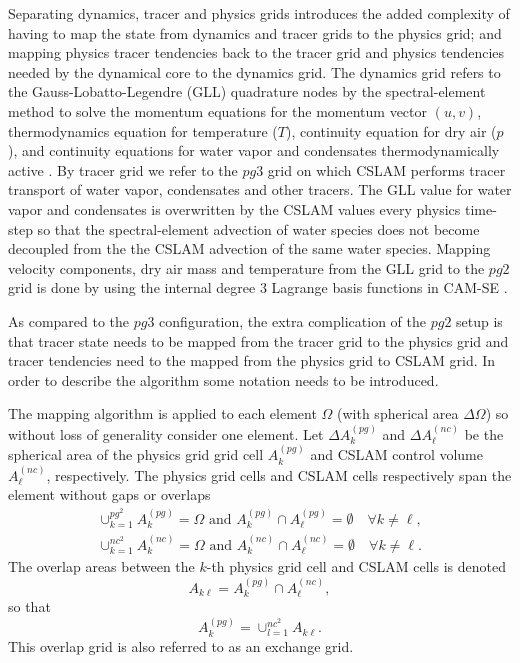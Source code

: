 Separating dynamics, tracer and physics grids introduces the added complexity of having to map the state from dynamics and tracer grids to the physics grid; and mapping physics tracer tendencies back to the tracer grid and physics tendencies needed by the dynamical core to the dynamics grid. The dynamics grid refers to the Gauss-Lobatto-Legendre (GLL) quadrature nodes by the spectral-element method to solve the momentum equations for the momentum vector $(u,v)$, thermodynamics equation for temperature ($T$), continuity equation for dry air ($p$), and continuity equations for water vapor and condensates thermodynamically active \citep[see, e.g., ][ for details]{LetAl2018JAMES}. By tracer grid we refer to the $pg3$ grid on which CSLAM performs tracer transport of water vapor, condensates and other tracers. The GLL value for water vapor and condensates is overwritten by the CSLAM values every physics time-step so that the spectral-element advection of water species does not become decoupled from the the CSLAM advection of the same water species. Mapping velocity components, dry air mass and temperature from the GLL grid to the $pg2$ grid is done by using the internal degree 3 Lagrange basis functions in CAM-SE \citep[ as described in  ][ for pg3; exactly the same methods can be used for $pg2$]{HL2018MWR}.

As compared to the $pg3$ configuration, the extra complication of the $pg2$ setup is that tracer state needs to be mapped from the tracer grid to the physics grid and tracer tendencies need to the mapped from the physics grid to CSLAM grid. In order to describe the algorithm some notation needs to be introduced.

The mapping algorithm is applied to each element $\Omega$ (with spherical area $\Delta \Omega$) so without loss of generality consider one element. Let $\Delta A^{(pg)}_k$ and $\Delta A^{(nc)}_\ell$ be the spherical area of the physics grid grid cell $A^{(pg)}_k$ and CSLAM control volume $A^{(nc)}_\ell$, respectively. The physics grid cells and CSLAM cells respectively span the element without gaps or overlaps
\begin{eqnarray}
\cup_{k=1}^{pg^2}A^{(pg)}_k=\Omega \text{ and } A^{(pg)}_k \cap A^{(pg)}_\ell = \emptyset \quad \forall k\ne \ell,\\
\cup_{k=1}^{nc^2}A^{(nc)}_k=\Omega \text{ and } A^{(nc)}_k \cap A^{(nc)}_\ell = \emptyset \quad \forall k\ne \ell.
\end{eqnarray}
The overlap areas between the $k$-th physics grid cell and CSLAM cells is denoted
\begin{equation}
A_{k\ell}=A^{(pg)}_k \cap A^{(nc)}_\ell,
\end{equation}
so that
\begin{equation}
A^{(pg)}_k=\cup_{l=1}^{nc^2}A_{k\ell}.
\end{equation}
This overlap grid is also referred to as an exchange grid.
